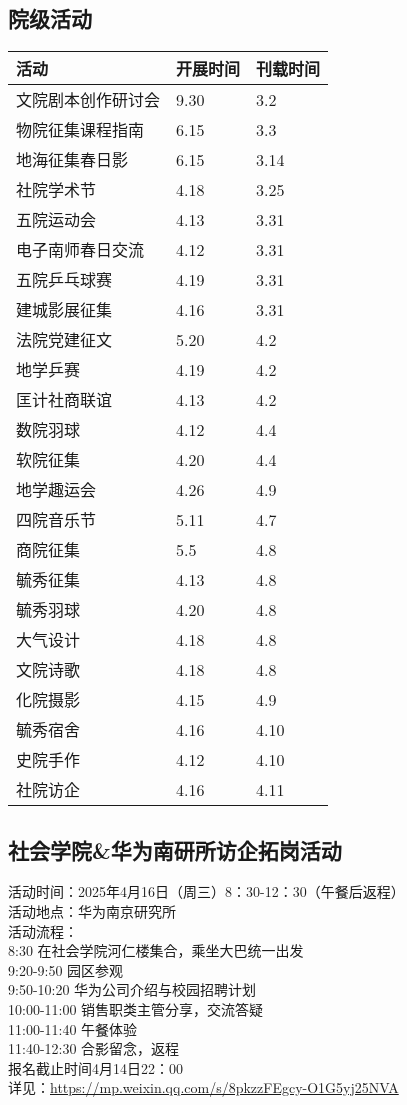 \documentclass[letterpaper, 12pt]{article}
\begin{document}
\begin{multicols}{2}
\section{院级活动}
\begin{tabular}{|>{\centering\arraybackslash}m{}|m{}|m{}|}
\hline
    活动 & 开展时间 & 刊载时间\\
    \hline\hline
    文院剧本创作研讨会 & 9.30 & 3.2\\
    物院征集课程指南 & 6.15 & 3.3\\
    地海征集春日影 & 6.15 & 3.14\\
    社院学术节 & 4.18 & 3.25\\
    五院运动会 & 4.13 & 3.31\\
    电子南师春日交流 & 4.12 & 3.31\\
    五院乒乓球赛 & 4.19 & 3.31\\
    建城影展征集 & 4.16 & 3.31\\
    法院党建征文 & 5.20 & 4.2\\
    地学乒赛 & 4.19 & 4.2\\
    匡计社商联谊 & 4.13 & 4.2\\
    数院羽球 & 4.12 & 4.4\\
    软院征集 & 4.20 & 4.4\\
    地学趣运会 & 4.26 & 4.9\\
    四院音乐节 & 5.11 & 4.7\\
    商院征集 & 5.5 & 4.8\\
    毓秀征集 & 4.13 & 4.8\\
    毓秀羽球 & 4.20 & 4.8\\
    大气设计 & 4.18 & 4.8\\
    文院诗歌 & 4.18 & 4.8\\
    化院摄影 & 4.15 & 4.9\\
    毓秀宿舍 & 4.16 & 4.10\\
    史院手作 & 4.12 & 4.10\\
    社院访企 & 4.16 & 4.11\\
    \hline
\end{tabular}

\subsection{社会学院\&华为南研所访企拓岗活动}
活动时间：2025年4月16日（周三）8：30-12：30（午餐后返程）
\\活动地点：华为南京研究所
\\活动流程：
\\8:30 在社会学院河仁楼集合，乘坐大巴统一出发
\\9:20-9:50 园区参观
\\9:50-10:20 华为公司介绍与校园招聘计划
\\10:00-11:00 销售职类主管分享，交流答疑
\\11:00-11:40 午餐体验
\\11:40-12:30 合影留念，返程
\\报名截止时间4月14日22：00
\\详见：\url{https://mp.weixin.qq.com/s/8pkzzFEgcy-O1G5yj25NVA}


\end{multicols}
\end{document}
